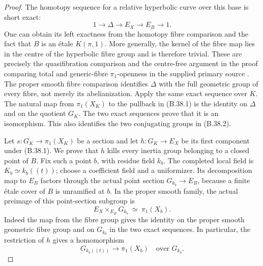 \documentclass[11pt,oneside]{article}
\begin{document}
\begin{proof}
The homotopy sequence for a relative hyperbolic curve
over this base is short exact:
\[
 1\longrightarrow\Delta\longrightarrow E_X
       \longrightarrow E_B\longrightarrow1.
 \tag{B.38.4}
\]
One can obtain its left exactness from the homotopy
fibre comparison and the fact that $B$ is an \'etale
$K(\pi,1)$. More generally, the kernel of the fibre
map lies in the centre of the hyperbolic fibre group
and is therefore trivial. These are precisely the
quasifibration comparison and the centre-free argument
in the proof comparing total and generic-fibre
$\pi_1$-openness in the supplied primary source
\cite{F-HolzschuhSchmidtStix}. The proper smooth fibre
comparison identifies $\Delta$ with the full geometric
group of every fibre, not merely its abelianization.
Apply the same exact sequence over $K$. The natural
map from $\pi_1(X_K)$ to the pullback in (B.38.1)
is the identity on $\Delta$ and on the quotient
$G_K$. The two exact sequences prove that it is an
isomorphism. This also identifies the two conjugating
groups in (B.38.2).

Let $s:G_K\to\pi_1(X_K)$ be a section and let
$h:G_K\to E_X$ be its first component under (B.38.1).
We prove that $h$ kills every inertia group belonging
to a closed point of $B$. Fix such a point $b$, with
residue field $k_b$. The completed local field is
$K_b\simeq k_b((t))$; choose a coefficient field and
a uniformizer. Its decomposition map to $E_B$
factors through the actual point section
$G_{k_b}\to E_B$, because a finite \'etale cover of
$B$ is unramified at $b$. In the proper smooth family,
the actual preimage of this point-section subgroup is
\[
 E_X\times_{E_B}G_{k_b}\ \simeq\ \pi_1(X_b).
 \tag{B.38.5}
\]
Indeed the map from the fibre group gives the identity
on the proper smooth geometric fibre group and on
$G_{k_b}$ in the two exact sequences. In particular,
the restriction of $h$ gives a homomorphism
\[
 G_{k_b((t))}\longrightarrow\pi_1(X_b)
                 \quad\text{over }G_{k_b}.
 \tag{B.38.6}
\]


\end{proof}
\end{document}
